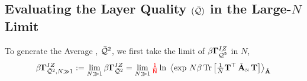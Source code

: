 \subsection{Evaluating the Layer Quality \texorpdfstring{$(\bar{\mathcal{Q}})$}{Q} in the Large-\texorpdfstring{$N$}{N} Limit}
\label{sxn:matgen_evaluation_hciz}

To generate the Average \Quality, $\bar{\mathcal{Q}}^{2}$, we first take the \largeN limit of $\beta\mathbf{\Gamma}^{IZ}_{\bar{\mathcal{Q}}^{2}}$ in $N$,
\begin{equation}
  \label{eqn:IZG_limit}
\IZGINF := \lim_{N \gg 1} \IZG 
= \lim_{N \gg 1}   \red{\tfrac{1}{N}}
\ln \; 
  \Expected[\AECS]{ 
    \exp\,
      N \beta \Trace{\tfrac{1}{N}\TMAT^{\top}\,\AECSN\,\TMAT}
  } 
\end{equation}
